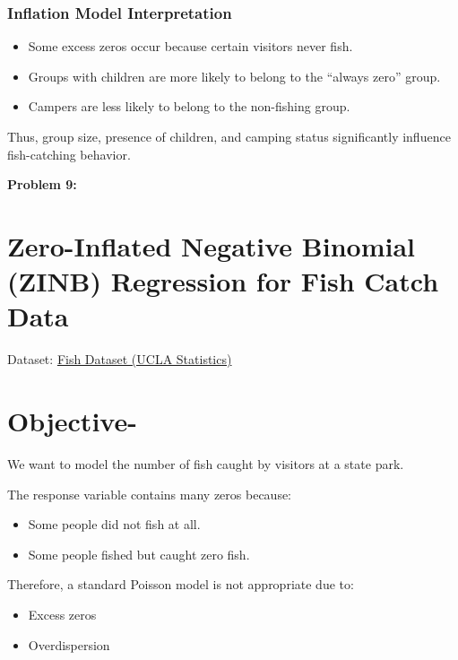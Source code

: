 \documentclass[
]{article}
\begin{document}
\subsubsection{Inflation Model
Interpretation}\label{inflation-model-interpretation}

\begin{itemize}
\item
  Some excess zeros occur because certain visitors never fish.
\item
  Groups with children are more likely to belong to the ``always zero''
  group.
\item
  Campers are less likely to belong to the non-fishing group.
\end{itemize}

Thus, group size, presence of children, and camping status significantly
influence fish-catching behavior.

\textbf{Problem 9:}

\section{Zero-Inflated Negative Binomial (ZINB) Regression for Fish
Catch
Data}\label{zero-inflated-negative-binomial-zinb-regression-for-fish-catch-data}

Dataset:
\href{https://stats.idre.ucla.edu/stat/data/fish.csv?utm_source=chatgpt.com}{Fish
Dataset (UCLA Statistics)}

\section{\texorpdfstring{\textbf{Objective-}}{Objective-}}\label{objective-}

We want to model the number of fish caught by visitors at a state park.

The response variable contains many zeros because:

\begin{itemize}
\item
  Some people did not fish at all.
\item
  Some people fished but caught zero fish.
\end{itemize}

Therefore, a standard Poisson model is not appropriate due to:

\begin{itemize}
\item
  Excess zeros
\item
  Overdispersion
\end{itemize}
\end{document}
